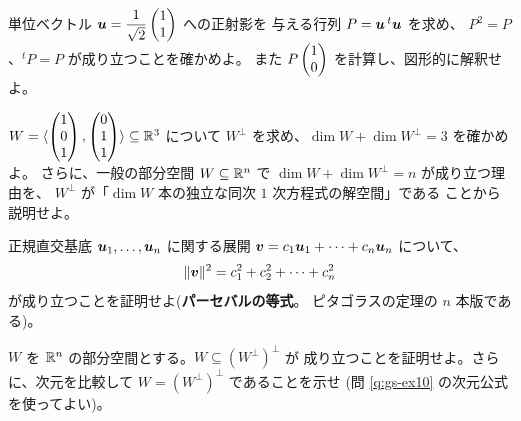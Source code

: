 \begin{mondai}[発展]\label{q:gs-ex9}
単位ベクトル $\bm{u} = \dfrac{1}{\sqrt{2}}\begin{pmatrix}1 \\ 1\end{pmatrix}$ への正射影を
与える行列 $P = \bm{u}\,{}^t\bm{u}$ を求め、
$P^2 = P$、${}^t\!P = P$ が成り立つことを確かめよ。
また $P\begin{pmatrix}1 \\ 0\end{pmatrix}$ を計算し、図形的に解釈せよ。
\end{mondai}

\begin{mondai}[発展]\label{q:gs-ex10}
$W = \langle \begin{pmatrix}1 \\ 0 \\ 1\end{pmatrix}, \begin{pmatrix}0 \\ 1 \\ 1\end{pmatrix} \rangle \subseteq \mathbb{R}^3$
について $W^{\perp}$ を求め、$\dim W + \dim W^{\perp} = 3$ を確かめよ。
さらに、一般の部分空間 $W \subseteq \mathbb{R}^n$ で
$\dim W + \dim W^{\perp} = n$ が成り立つ理由を、
$W^{\perp}$ が「$\dim W$ 本の独立な同次 $1$ 次方程式の解空間」である
ことから説明せよ。
\end{mondai}

\begin{mondai}[証明]\label{q:gs-ex11}
正規直交基底 $\bm{u}_1, \dots, \bm{u}_n$ に関する展開
$\bm{v} = c_1\bm{u}_1 + \cdots + c_n\bm{u}_n$ について、
\[
\|\bm{v}\|^2 = c_1^2 + c_2^2 + \cdots + c_n^2
\]
が成り立つことを証明せよ(\textbf{パーセバルの等式}。
ピタゴラスの定理の $n$ 本版である)。
\end{mondai}

\begin{mondai}[証明]\label{q:gs-ex12}
$W$ を $\mathbb{R}^n$ の部分空間とする。$W \subseteq (W^{\perp})^{\perp}$ が
成り立つことを証明せよ。さらに、次元を比較して
$W = (W^{\perp})^{\perp}$ であることを示せ
(問 \ref{q:gs-ex10} の次元公式を使ってよい)。
\end{mondai}

